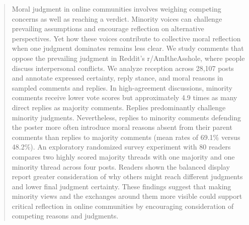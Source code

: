 \documentclass[sigconf, anonymous, review, balance=false]{acmart}
\newcommand{\mj}[1]{{\color{orange}{#1}}}
\begin{document}
\begin{abstract}
Moral judgment in online communities involves weighing competing
concerns as well as reaching a verdict. Minority voices can
challenge prevailing assumptions and encourage reflection on
alternative perspectives. Yet how these voices contribute to
collective moral reflection when one judgment dominates remains
less clear. We study comments that oppose the
prevailing judgment in Reddit's r/AmItheAsshole, where people
discuss interpersonal conflicts. We analyze reception across
28,107 posts and annotate expressed certainty, reply stance, and
moral reasons in sampled comments and replies. In high-agreement
discussions, minority comments receive lower vote scores but
approximately 4.9 times as many direct replies as majority comments.
Replies predominantly challenge minority judgments. Nevertheless,
replies to minority comments defending the poster more often
introduce moral reasons absent from their parent comments than
replies to majority comments (mean rates of 69.1\% versus 48.2\%).
An exploratory randomized survey experiment with 80 readers
compares two highly scored majority threads with one majority
and one minority thread across four posts. Readers shown the
balanced display report greater consideration of why others
might reach different judgments and lower final judgment certainty.
These findings suggest that making minority views and the exchanges
around them more visible could support critical reflection in
online communities by encouraging consideration of competing
reasons and judgments.

\end{abstract}
\end{document}
